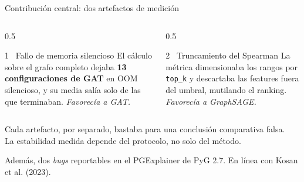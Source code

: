 \documentclass[aspectratio=169,11pt]{beamer}
\begin{document}
\begin{frame}{Contribución central: dos artefactos de medición}
\begin{columns}[T]
\begin{column}{0.5\textwidth}
\begin{alertblock}{1 \textperiodcentered\ Fallo de memoria silencioso}
\small El cálculo sobre el grafo completo dejaba \textbf{13 configuraciones de GAT} en OOM silencioso, y su media salía solo de las que terminaban. \emph{Favorecía a GAT.}
\end{alertblock}
\end{column}
\begin{column}{0.5\textwidth}
\begin{alertblock}{2 \textperiodcentered\ Truncamiento del Spearman}
\small La métrica dimensionaba los rangos por \texttt{top\_k} y descartaba las features fuera del umbral, mutilando el ranking. \emph{Favorecía a GraphSAGE.}
\end{alertblock}
\end{column}
\end{columns}
\vspace{0.5em}
\begin{center}\small
\alert{Cada artefacto, por separado, bastaba para una conclusión comparativa falsa.}\\ La estabilidad medida depende del protocolo, no solo del método.
\end{center}
\vspace{0.2em}
{\scriptsize\color{muted}\hfill Además, dos \emph{bugs} reportables en el PGExplainer de PyG 2.7. En línea con Kosan et al. (2023).\hspace*{0.3cm}}
\end{frame}
\end{document}
